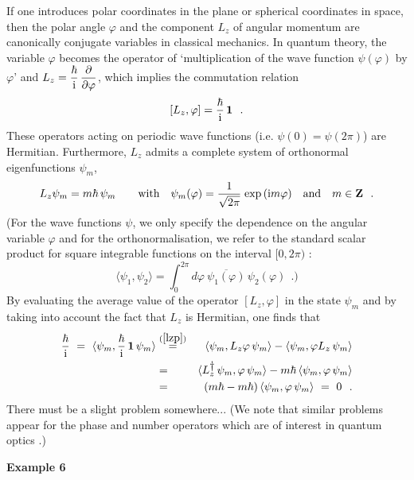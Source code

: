 \documentclass[a4wide,12pt]{report}
\begin{document}
 If one  introduces polar coordinates in the plane or spherical 
coordinates in space, then the polar angle $\varphi$ 
and the  component $L_z$ of angular momentum 
are canonically conjugate variables in classical mechanics. 
In quantum theory, the variable $\varphi$ becomes the operator 
of `multiplication of the wave function $\psi (\varphi)$ by $\varphi$' 
and $L_z = \displaystyle{\hbar \over {\rm i}} \, \displaystyle{\partial\over \partial\varphi}$,
which implies the commutation relation 
\begin{equation}
\label{lzp}
[ L_z ,  \varphi ] = {\hbar \over {\rm i}} \, {\bf 1}
\ \ .
\end{equation}
These operators acting on periodic wave functions  
(i.e. $\psi (0) = \psi (2\pi)$) are Hermitian. 
Furthermore, $L_z $ admits a complete system of orthonormal 
eigenfunctions $\psi_m$,
\begin{equation}
L_z \psi_m =  m \hbar \, \psi_m
\qquad {\rm with} \quad
\psi_m (\varphi ) = {1 \over \sqrt{2 \pi}} \;
{\rm exp} \, ({\rm i}
m \varphi )
\quad {\rm and} \quad
m \in {\bf Z}
\ \ .
\end{equation}
(For the wave functions $\psi$, we only specify the dependence on the 
angular variable $\varphi$ and for the orthonormalisation, we 
refer to the standard scalar product for square integrable functions 
on the interval $[0, 2\pi )$ :
\[
\langle \psi_1 , \psi_2 \rangle = \int_0^{2 \pi}
d\varphi \ \overline{\psi_1 (\varphi )} \, \psi_2 (\varphi )
\ \ .)
\]
By evaluating the average value of the operator 
$[ L_z ,  \varphi ]$ in the state $\psi_m$ \cite{car,grau}
and by taking into account the fact that 
$L_z $ is Hermitian, one finds that 
\begin{eqnarray}
{\hbar \over {\rm i}} \ = \
\langle \psi_m ,
{\hbar \over {\rm i}} \, {\bf 1} \, \psi_m \rangle
& \stackrel{(\ref{lzp})}{=} &
\langle \psi_m , L_z  \varphi \, \psi_m \rangle -
\langle \psi_m , \varphi L_z \, \psi_m \rangle
\nonumber \\
& = &
\langle L_z ^{\displaystyle{\dagger}} \, \psi_m , \varphi \, \psi_m \rangle -m \hbar
\, \langle \psi_m , \varphi \, \psi_m \rangle
\label{deriv}
\\
& = &
( m \hbar -  m \hbar )
\, \langle \psi_m , \varphi \, \psi_m \rangle
\ = \ 0
\ \ .
\nonumber
\end{eqnarray}
There must be a slight problem somewhere... 
(We note that similar problems appear for the phase 
and number operators which are of interest 
in quantum optics \cite{car,qo}.)

\bigskip
 
 
\noindent 
{\bf Example 6}
 
\end{document}
